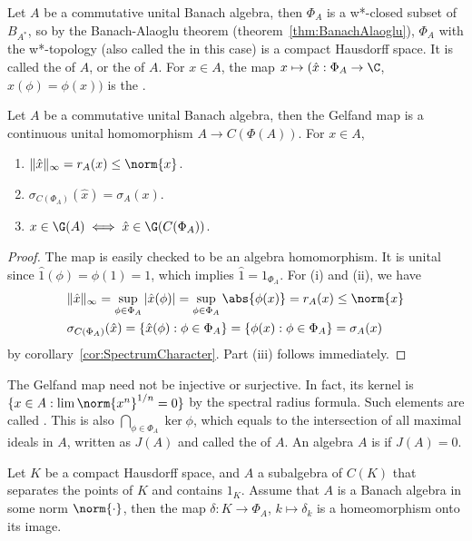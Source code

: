 \documentclass[a4paper]{article}
\begin{document}
Let $A$ be a commutative unital Banach algebra, then $\Phi_A$ is a w*-closed subset of $B_{A^*}$, so by the Banach-Alaoglu theorem (theorem~\ref{thm:BanachAlaoglu}), $\Phi_A$ with the w*-topology (also called the  in this case) is a compact Hausdorff space. It is called the  of $A$, or the  of $A$. For $x\in A$, the map $x\mapsto(\hat{x}:\Phi_A\to\C$, $\hat{x}(\phi)=\phi(x))$ is the .

\begin{nthm}\label{thm:GelfandRep}
	Let $A$ be a commutative unital Banach algebra, then the Gelfand map is a continuous unital homomorphism $A\to C(\Phi(A))$. For $x\in A$,
	\begin{enumerate}[label=(\roman*)]
		\item $\|\hat{x}\|_\infty=r_A(x)\leq\norm{x}$.
		\item $\sigma_{C(\Phi_A)}(\hat{x})=\sigma_A(x)$.
		\item $x\in\G(A)\iff\hat{x}\in\G(C(\Phi_A))$.
	\end{enumerate}
\end{nthm}
\begin{proof}
  The map is easily checked to be an algebra homomorphism. It is unital since $\hat{1}(\phi)=\phi(1)=1$, which implies $\hat{1}=1_{\Phi_A}$. For (i) and (ii), we have
	\begin{align*}
		& \|\hat{x}\|_\infty=\sup_{\phi\in\Phi_A}|\hat{x}(\phi)|=\sup_{\phi\in\Phi_A}\abs{\phi(x)}=r_A(x)\leq\norm{x}\\
		&\sigma_{C(\Phi_A)}(\hat{x})=\{\hat{x}(\phi):\phi\in\Phi_A\}=\{\phi(x):\phi\in\Phi_A\}=\sigma_A(x)
	\end{align*}
  by corollary~\ref{cor:SpectrumCharacter}. Part (iii) follows immediately.
\end{proof}

\begin{remark}
  The Gelfand map need not be injective or surjective. In fact, its kernel is $\{x\in A:\lim\norm{x^n}^{1/n}=0\}$ by the spectral radius formula. Such elements are called . This is also $\bigcap_{\phi\in\Phi_A}\ker\phi$, which equals to the intersection of all maximal ideals in $A$, written as $J(A)$ and called the  of $A$. An algebra $A$ is  if $J(A)=0$.
\end{remark}

\begin{nlemma}\label{lem:EmbedIntoCharacteR}
  Let $K$ be a compact Hausdorff space, and $A$ a subalgebra of $C(K)$ that separates the points of $K$ and contains $1_K$. Assume that $A$ is a Banach algebra in some norm $\norm{\cdot}$, then the map $\delta:K\to\Phi_A$, $k\mapsto\delta_k$ is a homeomorphism onto its image.
\end{nlemma}
\end{document}
